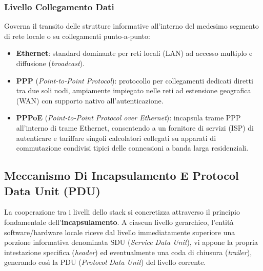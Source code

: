 \documentclass[11pt, a4paper]{article}
\begin{document}
\subsubsection{Livello Collegamento Dati}
Governa il transito delle strutture informative all'interno del medesimo segmento di rete locale o su collegamenti punto-a-punto:
\begin{itemize}
    \item \textbf{Ethernet}: standard dominante per reti locali (LAN) ad accesso multiplo e diffusione (\emph{broadcast}).
    \item \textbf{PPP} (\emph{Point-to-Point Protocol}): protocollo per collegamenti dedicati diretti tra due soli nodi, ampiamente impiegato nelle reti ad estensione geografica (WAN) con supporto nativo all'autenticazione.
    \item \textbf{PPPoE} (\emph{Point-to-Point Protocol over Ethernet}): incapsula trame PPP all'interno di trame Ethernet, consentendo a un fornitore di servizi (ISP) di autenticare e tariffare singoli calcolatori collegati su apparati di commutazione condivisi tipici delle connessioni a banda larga residenziali.
\end{itemize}

\subsection{Meccanismo Di Incapsulamento E Protocol Data Unit (PDU)}

La cooperazione tra i livelli dello stack si concretizza attraverso il principio fondamentale dell'\textbf{incapsulamento}. A ciascun livello gerarchico, l'entità software/hardware locale riceve dal livello immediatamente superiore una porzione informativa denominata SDU (\emph{Service Data Unit}), vi appone la propria intestazione specifica (\emph{header}) ed eventualmente una coda di chiusura (\emph{trailer}), generando così la PDU (\emph{Protocol Data Unit}) del livello corrente.

\end{document}
